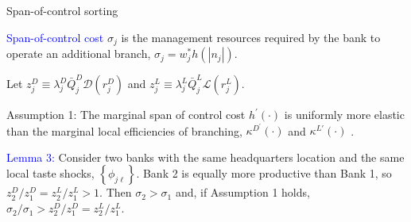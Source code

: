 \documentclass[notes,10pt, aspectratio=169]{beamer}
\newenvironment{wideitemize}{\itemize\addtolength{\itemsep}{10pt}}{\enditemize}
\begin{document}
\begin{frame}{Span-of-control sorting}

    \begin{wideitemize}

        \item \textcolor{blue}{Span-of-control cost} $\sigma_j$ is the management resources required by the bank to operate an additional branch, 
        $\sigma_j = w_j^* h\left(\left|n_j\right|\right)$.
        \item Let $z_j^D \equiv \lambda_j^D \bar{Q}_j^D \mathcal{D}\left(r_j^D\right)$ and $z_j^L \equiv \lambda_j^L \bar{Q}_j^L \mathcal{L}\left(r_j^L\right)$.
        \item Assumption 1: The marginal span of control cost $h^{\prime}(\cdot)$ is uniformly more elastic than the marginal local efficiencies of branching, $\kappa^{D^{\prime}}(\cdot)$ and $\kappa^{L \prime}(\cdot)$ .
        
        
        \item \textcolor{blue}{Lemma 3:} Consider two banks with the same headquarters location and the same local taste shocks, $\left\{\phi_{j \ell}\right\}$. Bank 2 is equally more productive than Bank 1, so $z_2^D / z_1^D=z_2^L / z_1^L>1$. Then $\sigma_2>\sigma_1$ and, if Assumption 1 holds, $\sigma_2 / \sigma_1>z_2^D / z_1^D=z_2^L / z_1^L$.
        

    \end{wideitemize}
\end{frame}
\end{document}
